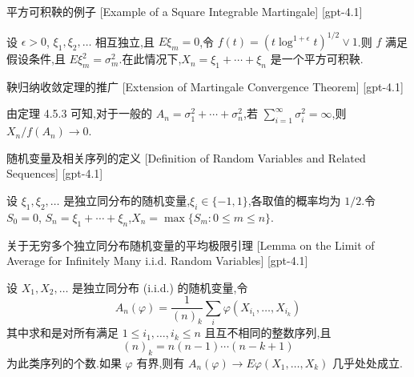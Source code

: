 \documentclass[UTF8]{ctexart}
\begin{document}
    
    
    \begin{xmp}
        {平方可积鞅的例子}
        [Example of a Square Integrable Martingale]
        [gpt-4.1]
        
设 $\epsilon > 0$, $\xi_1, \xi_2, \ldots$ 相互独立,且 $E \xi_m = 0$,令 $f(t) = (t \log^{1+\epsilon} t)^{1/2} \vee 1$.则 $f$ 满足假设条件,且 $E \xi_m^2 = \sigma_m^2$.在此情况下,$X_n = \xi_1 + \cdots + \xi_n$ 是一个平方可积鞅.

    \end{xmp}
    
    
    
    \begin{thm}
        {鞅归纳收敛定理的推广}
        [Extension of Martingale Convergence Theorem]
        [gpt-4.1]
        
由定理 4.5.3 可知,对于一般的 $A_n = \sigma_1^2 + \cdots + \sigma_n^2$,若 $\sum_{i=1}^{\infty} \sigma_i^2 = \infty$,则 $X_n / f(A_n) \to 0$.

    \end{thm}
    
    
    
    \begin{dfn}
        {随机变量及相关序列的定义}
        [Definition of Random Variables and Related Sequences]
        [gpt-4.1]
        
设 $\xi_{1}, \xi_{2}, \ldots$ 是独立同分布的随机变量,$\xi_i \in \{-1, 1\}$,各取值的概率均为 $1/2$.令 $S_{0} = 0$, $S_{n} = \xi_{1} + \cdots + \xi_{n}$,$X_{n} = \max\{S_{m}: 0 \leq m \leq n\}$.

    \end{dfn}
    
    
    
    \begin{lma}
        {关于无穷多个独立同分布随机变量的平均极限引理}
        [Lemma on the Limit of Average for Infinitely Many i.i.d. Random Variables]
        [gpt-4.1]
        
设 $X_{1}, X_{2}, \dots$ 是独立同分布 (i.i.d.) 的随机变量,令
\[
A_{n}(\varphi) = \frac{1}{(n)_k} \sum_{i} \varphi(X_{i_{1}}, \ldots, X_{i_{k}})
\]
其中求和是对所有满足 $1 \leq i_{1}, \ldots, i_{k} \leq n$ 且互不相同的整数序列,且
\[
(n)_k = n(n-1)\cdots(n-k+1)
\]
为此类序列的个数.如果 $\varphi$ 有界,则有 $A_{n}(\varphi) \to E\varphi(X_{1}, \dots, X_{k})$ 几乎处处成立.

    \end{lma}
    
\end{document}
